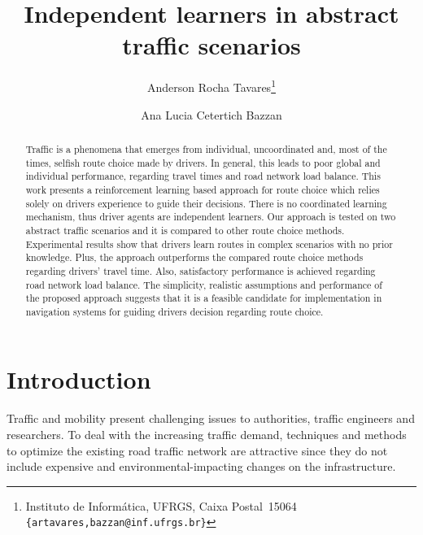 \documentclass{RITA}
\author{
  Anderson Rocha Tavares\footnote{Instituto de Inform\'atica, UFRGS, Caixa Postal~15064\\
  \texttt{\{artavares,bazzan@inf.ufrgs.br\}}}
  \and Ana Lucia Cetertich Bazzan\footnotemark[1]
}
\title{Independent learners in abstract traffic scenarios}
\begin{document}
\maketitle

\begin{abstract}
Traffic is a phenomena that emerges from individual, uncoordinated and, most of the times, selfish route choice made by drivers. In general, this leads to poor global and individual performance, regarding travel times and road network load balance. This work presents a reinforcement learning based approach for route choice which relies solely on drivers experience to guide their decisions. 
There is no coordinated learning mechanism, thus driver agents are independent learners. Our approach is tested on two abstract traffic scenarios and it is compared to other route choice methods. 
Experimental results show that drivers learn routes in complex scenarios with no prior knowledge. Plus, the approach outperforms the compared route choice methods regarding drivers' travel time. Also, satisfactory performance is achieved regarding road network load balance. 
The simplicity, realistic assumptions and performance of the proposed approach suggests that it is a feasible candidate for implementation in navigation systems for guiding drivers decision regarding route choice.
\end{abstract}





\section{Introduction}
\label{sec:intro}

Traffic and mobility present challenging issues to authorities, traffic engineers and researchers. To deal with the increasing traffic demand, techniques and methods to optimize the existing road traffic network are attractive since they do not include expensive and environmental-impacting changes on the infrastructure.
\end{document}
